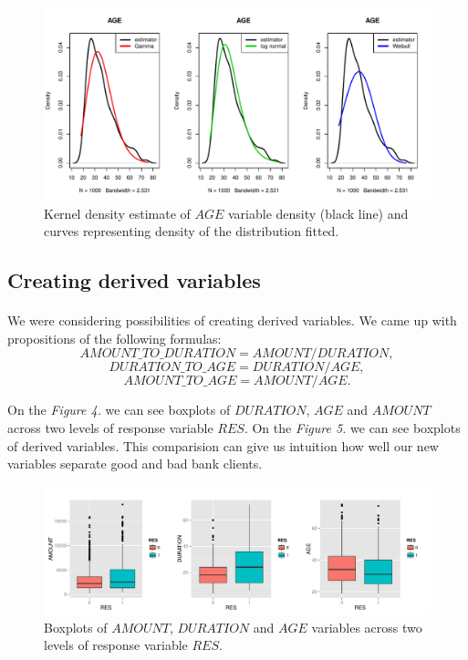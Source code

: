 \documentclass[10pt]{article}\usepackage[]{graphicx}\usepackage[]{color}
\newenvironment{knitrout}{}{} %
\begin{document}
\begin{figure}[h!]
\centering
\begin{knitrout}
\color{fgcolor}
\includegraphics[width=.95\linewidth]{figure/unnamed-chunk-5-1} 

\end{knitrout}
\caption{Kernel density estimate of $AGE$ variable density (black line) and curves representing density of the distribution fitted.}
\end{figure}


\clearpage
\subsection{Creating derived variables}
\paragraph{}

We were considering possibilities of creating derived variables. We came up with propositions of the following formulas:
$$AMOUNT\_TO\_DURATION = AMOUNT / DURATION,$$
$$DURATION\_TO\_AGE = DURATION / AGE,$$
$$AMOUNT\_TO\_AGE = AMOUNT / AGE.$$

On the \textit{Figure 4.} we can see boxplots of $DURATION$, $AGE$ and $AMOUNT$ across two levels of response variable $RES$. On the \textit{Figure 5.} we can see boxplots of derived variables. This comparision can give us intuition how well our new variables separate good and bad bank clients.

\begin{figure}[h!]
\centering
\begin{knitrout}
\color{fgcolor}
\includegraphics[width=.99\linewidth]{figure/unnamed-chunk-6-1} 

\end{knitrout}
\caption{Boxplots of $AMOUNT$, $DURATION$ and $AGE$ variables across two levels of response variable $RES$.}
\end{figure}
\end{document}
